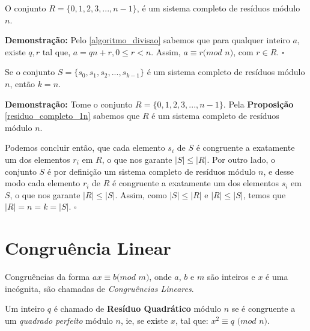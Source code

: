 \begin{proposition}\label{residuo_completo_1n}
O conjunto $R = \{0, 1, 2, 3,...,n-1\}$, é um sistema completo de resíduos módulo $n$.
\end{proposition}
\textbf{Demonstração:}
Pelo \autoref{algoritmo_divisao} sabemos que para qualquer inteiro $a$, existe $q, r$ tal que, $a = qn + r, 0 \leq r < n$. Assim, $a\equiv r(mod$ $n)$, com $r \in R$. $\square$
\\

\begin{theorem}
Se o conjunto $S = \{s_0, s_1, s_2, ..., s_{k-1}\}$ é um sistema completo de resíduos módulo $n$, então $k=n$.
\end{theorem}
\textbf{Demonstração:}
Tome o conjunto $R = \{0, 1, 2, 3,...,n-1\}$. Pela \textbf{Proposição} \autoref{residuo_completo_1n} sabemos que $R$ é um sistema completo de resíduos módulo $n$.

Podemos concluir então, que cada elemento $s_i$ de $S$ é congruente a exatamente um dos elementos $r_i$ em $R$, o que nos garante $|S| \leq |R|$. 
Por outro lado, o conjunto $S$ é por definição um sistema completo de resíduos módulo $n$, e desse modo cada elemento $r_i$ de $R$ é congruente a exatamente um dos elementos $s_i$ em $S$, o que nos garante $|R| \leq |S|$.
Assim, como $|S| \leq |R|$ e $|R| \leq |S|$, temos que $|R| = n = k = |S|$. $\square$
\\




\section{Congruência Linear}

\begin{definition}
Congruências da forma $ax \equiv b (mod$ $m)$, onde $a$, $b$ e $m$ são inteiros e $x$ é uma incógnita, são chamadas de \textit{Congruências Lineares}.
\newline
\end{definition}


\begin{definition}\label{def_residuo_quadratico}
Um inteiro $q$ é chamado de \textbf{Resíduo Quadrático} módulo $n$ se é congruente a um \textit{quadrado perfeito} módulo $n$, ie, se existe $x$, tal que:
$x^2 \equiv q$ $(mod$ $n)$. 
\newline 
\end{definition}

